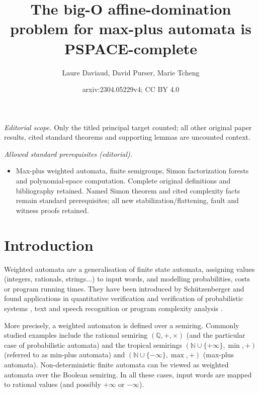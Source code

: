 \documentclass[10pt,a4paper]{amsart}
\title{The big-O affine-domination problem for max-plus automata is PSPACE-complete}
\author{Laure Daviaud, David Purser, Marie Tcheng}
\date{arxiv:2304.05229v4; CC BY 4.0}
\theoremstyle{definition}
\numberwithin{equation}{section}
\theoremstyle{remark}
\theoremstyle{remark}
\begin{document}
\maketitle
\noindent\textit{Editorial scope.} Only the titled principal target counted; all other original paper results, cited standard theorems and supporting lemmas are uncounted context.\par\medskip
\noindent\textit{Allowed standard prerequisites (editorial).}\begin{itemize}
\item Max-plus weighted automata, finite semigroups, Simon factorization forests and polynomial-space computation. Complete original definitions and bibliography retained. Named Simon theorem and cited complexity facts remain standard prerequisites; all new stabilization/flattening, fault and witness proofs retained.
\end{itemize}\medskip
\section{Introduction}

Weighted automata are a generalisation of finite state automata, assigning values (integers, rationals, strings...) to input words, and modelling probabilities, costs or program running times. They have been introduced by Sch\"utzenberger \cite{Schutzenberger61b} and found applications in quantitative verification \cite{ChatterjeeDH10} and verification of probabilistic systems \cite{Vardi85}, text and speech recognition \cite{MohriPR02} or program complexity analysis  \cite{ColcombetDZ14}. 

More precisely, a weighted automaton is defined over a semiring. Commonly studied examples include the rational semiring $(\mathbb{Q},+,\times)$ (and the particular case of probabilistic automata) and the tropical semirings $(\mathbb{N}\cup\{+\infty\},\min,+)$ (referred to as min-plus automata) and  $(\mathbb{N}\cup\{-\infty\},\max,+)$ (max-plus automata). Non-deterministic finite automata can be viewed as weighted automata over the Boolean semiring. In all these cases, input words are mapped to rational values (and possibly $+\infty$ or $-\infty$).
\end{document}
